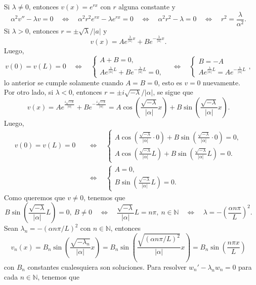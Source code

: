 \documentclass[12pt]{article}
\providecommand{\abs}[1]{\lvert#1\rvert}
\newcommand{\N}{\mathbb{N}}
\newcommand{\pp}[1]{\left( #1 \right)}
\newcommand{\Ssi}{\quad\Longleftrightarrow\quad}
\renewcommand{\l}{\lambda}
\renewcommand{\a}{\alpha}
\renewcommand{\abs}[1]{\left\lvert#1\right\rvert}
\begin{document}
\begin{enumerate}
\begin{enumerate}
            Si $\l\neq 0$, entonces $v(x)=e^{rx}$ con $r$ alguna constante y
            \[ \a^2v''-\l v=0\Ssi \a^2r^2e^{rx}-\l e^{rx}=0 \Ssi \a^2r^2-\l =0 \Ssi r^2 =\frac{\l}{\a^2}. \]
            Si $\l>0$, entonces $r=\pm\sqrt{\l}/\abs{a}$ y
            \[v(x)=Ae^{\tfrac{\l}{|\a|}x}+B e^{-\tfrac{\l}{|\a|}x}.\]
            Luego,
            \[v(0)=v(L)=0\Ssi
            \begin{cases}
                A+B =0,\\
                Ae^{\tfrac{\l}{|\a|}L}+B e^{-\tfrac{\l}{|\a|}L}=0,
            \end{cases}
            \Ssi
            \begin{cases}
                B=-A\\
                Ae^{\tfrac{\l}{|\a|}L}=A e^{-\tfrac{\l}{|\a|}L}
            \end{cases},
            \]
            lo anterior se cumple solamente cuando $A=B=0$, esto es $v=0$ nuevamente. Por otro lado, si $\l<0$, entonces $r=\pm i\sqrt{-\l}/|\a|$, se sigue que
            \[ v(x) = Ae^{\frac{i\sqrt{-\l}}{|\a|}}+Be^{-\frac{i\sqrt{-\l}}{|\a|}}=A\cos\pp{\frac{\sqrt{-\l}}{|\a|}x}+B\sin\pp{\frac{\sqrt{-\l}}{|\a|}x}. \]
            Luego,
            \begin{align*}
                v(0)=v(L)=0 &\Ssi \begin{cases}
                    A\cos\pp{\frac{\sqrt{-\l}}{|\a|}\cdot 0}+B\sin\pp{\frac{\sqrt{-\l}}{|\a|}\cdot 0}=0,\\
                    A\cos\pp{\frac{\sqrt{-\l}}{|\a|}L}+B\sin\pp{\frac{\sqrt{-\l}}{|\a|}L}=0.
                \end{cases}\\
                &\Ssi\begin{cases}
                    A=0,\\
                    B\sin\pp{\frac{\sqrt{-\l}}{|\a|}L}=0.
                \end{cases}
            \end{align*}
            Como queremos que $v\neq 0$, tenemos que
            \[ B\sin\pp{\frac{\sqrt{-\l}}{|\a|}L}=0,~ B\neq 0\Ssi \frac{\sqrt{-\l}}{|\a|}L=n\pi,~n\in\N \Ssi \l=-\pp{\frac{\a n\pi}{L}}^2. \]
            Sean $\l_n=-\pp{\a n\pi/L}^2$ con $n\in\N$, entonces
            \[ v_n(x)=B_n\sin\pp{\frac{\sqrt{-\l_n}}{|\a|}x}=B_n\sin\pp{\frac{\sqrt{\pp{\a n\pi/L}^2}}{|\a|}x}=B_n\sin\pp{\frac{n\pi x}{L}} \]
            con $B_n$ constantes cualesquiera son soluciones.
            Para resolver ${w_n}'-\l_n w_n=0$ para cada $n\in\N$, tenemos que

\end{enumerate}
\end{enumerate}
\end{document}
